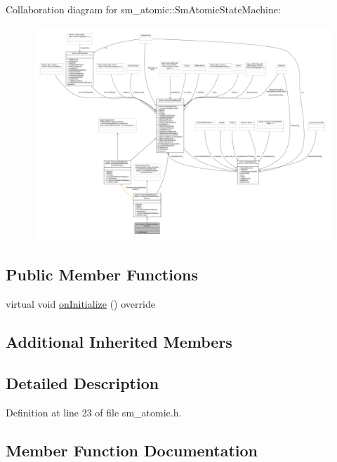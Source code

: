 Collaboration diagram for sm\+\_\+atomic\+:\+:Sm\+Atomic\+State\+Machine\+:
\nopagebreak
\begin{figure}[H]
\begin{center}
\leavevmode
\includegraphics[width=350pt]{structsm__atomic_1_1SmAtomicStateMachine__coll__graph}
\end{center}
\end{figure}
\subsection*{Public Member Functions}
\begin{DoxyCompactItemize}
\item 
virtual void \hyperlink{structsm__atomic_1_1SmAtomicStateMachine_a607f4bbb5f0a3323293f59837bc55284}{on\+Initialize} () override
\end{DoxyCompactItemize}
\subsection*{Additional Inherited Members}


\subsection{Detailed Description}


Definition at line 23 of file sm\+\_\+atomic.\+h.



\subsection{Member Function Documentation}

